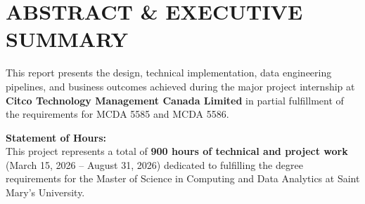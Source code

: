\section*{\Large \bfseries \textcolor{smumaroon}{ABSTRACT \& EXECUTIVE SUMMARY}}

This report presents the design, technical implementation, data engineering pipelines, and business outcomes achieved during the major project internship at \textbf{Citco Technology Management Canada Limited} in partial fulfillment of the requirements for MCDA 5585 and MCDA 5586.

\vspace{0.5cm}

\textbf{Statement of Hours:} \\
This project represents a total of \textbf{900 hours of technical and project work} (March 15, 2026 -- August 31, 2026) dedicated to fulfilling the degree requirements for the Master of Science in Computing and Data Analytics at Saint Mary's University.

\clearpage
